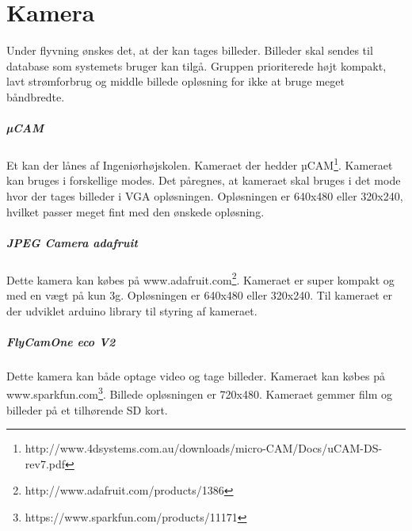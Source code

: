 \section{Kamera}

Under flyvning ønskes det, at der kan tages billeder. Billeder skal sendes til database som systemets bruger kan tilgå. Gruppen prioriterede højt kompakt, lavt strømforbrug og middle billede opløsning for ikke at bruge meget båndbredte. 

\subparagraph*{µCAM}
Et kan der lånes af Ingeniørhøjskolen. Kameraet der hedder µCAM\footnote{http://www.4dsystems.com.au/downloads/micro-CAM/Docs/uCAM-DS-rev7.pdf}. Kameraet kan bruges i forskellige modes. Det påregnes, at kameraet skal bruges i det mode hvor der tages billeder i VGA opløsningen. Opløsningen er 640x480 eller 320x240, hvilket passer meget fint med den ønskede opløsning.

\subparagraph*{JPEG Camera adafruit}
Dette kamera kan købes på www.adafruit.com\footnote{http://www.adafruit.com/products/1386}. Kameraet er super kompakt og med en vægt på kun 3g. Opløsningen er  640x480 eller 320x240. Til kameraet er der udviklet arduino library til styring af kameraet.

\subparagraph*{FlyCamOne eco V2}
Dette kamera kan både optage video og tage billeder. Kameraet kan købes på www.sparkfun.com\footnote{https://www.sparkfun.com/products/11171}. Billede opløsningen er 720x480. Kameraet gemmer film og billeder på et tilhørende SD kort. 





